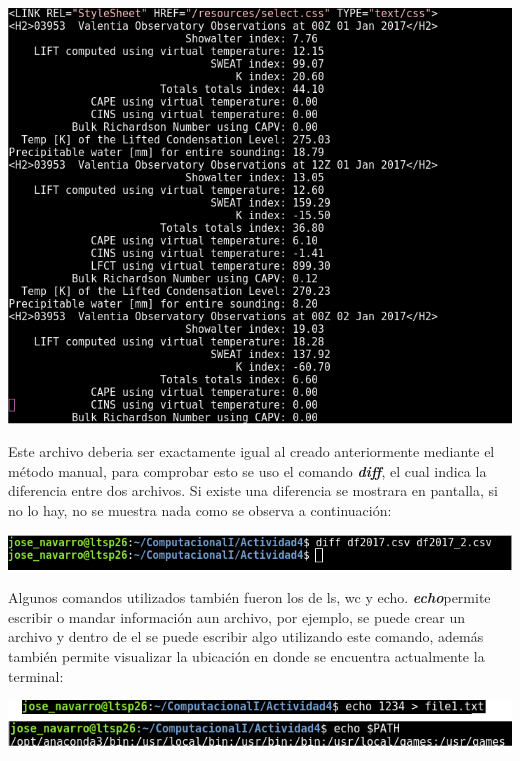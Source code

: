 \documentclass[12pt]{article}
\begin{document}
\begin{center}
\includegraphics[scale=0.55]{archnuevo.png}
\end{center} 

Este archivo deberia ser exactamente igual al creado anteriormente mediante el método manual, para comprobar esto se uso el comando \textbf{\textit{diff}}, el cual indica la diferencia entre dos archivos. Si existe una diferencia se mostrara en pantalla, si no lo hay, no se muestra nada como se observa a continuación: \\

\begin{center}
\includegraphics[scale=0.55]{diff.png}
\end{center} 

Algunos comandos utilizados también fueron los de ls, wc y echo. \textbf{\textit{echo}}permite escribir o mandar información aun archivo, por ejemplo, se puede crear un archivo y dentro de el se puede escribir algo utilizando este comando, además también permite visualizar la ubicación en donde se encuentra actualmente la terminal:

\begin{center}
\includegraphics[scale=0.55]{echo.png}
\end{center} 
\end{document}
